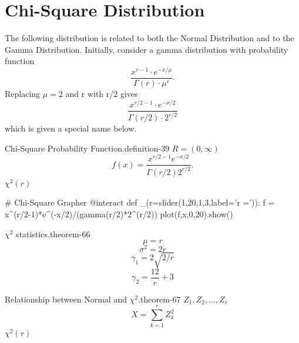 \documentclass[10pt,]{book}
\numberwithin{equation}{section}
\begin{document}
\section[{Chi-Square Distribution}]{Chi-Square Distribution}\label{section-59}
\hypertarget{p-1200}{}%
The following distribution is related to both the Normal Distribution and to the Gamma Distribution. Initially, consider a gamma distribution with probability function%
\begin{equation*}
\frac{x^{r-1} \cdot e^{-x / \mu}}{\Gamma(r) \cdot \mu^r}.
\end{equation*}
Replacing \(\mu = 2\) and r with r/2 gives%
\begin{equation*}
\frac{x^{r/2-1} \cdot e^{-x/2}}{\Gamma(r/2) \cdot 2^{r/2}}
\end{equation*}
which is given a special name below.%
\par
\hypertarget{p-1201}{}%
\begin{definition}{Chi-Square Probability Function.}{definition-39}%
\(R = (0,\infty)\)%
\begin{equation*}
f(x) = \frac{x^{r/2-1} e^{-x/2} }{\Gamma(r/2) 2^{r/2}}.
\end{equation*}
\(\chi^2(r)\)\end{definition}
%
\par
\hypertarget{p-1202}{}%
\leavevmode%
\begin{sageinput}
# Chi-Square Grapher
@interact
def _(r=slider(1,20,1,3,label='r =')):
    f = x^(r/2-1)*e^(-x/2)/(gamma(r/2)*2^(r/2))
    plot(f,x,0,20).show()
\end{sageinput}
%
\par
\hypertarget{p-1203}{}%
\begin{theorem}{\(\chi^2\) statistics.}{}{theorem-66}%
%
\begin{equation*}
\mu = r
\end{equation*}
%
\begin{equation*}
\sigma^2 = 2r
\end{equation*}
%
\begin{equation*}
\gamma_1 = 2 \sqrt{2/r}
\end{equation*}
%
\begin{equation*}
\gamma_2 = \frac{12}{r} + 3
\end{equation*}
\end{theorem}
%
\par
\hypertarget{p-1204}{}%
\begin{theorem}{Relationship between Normal and \(\chi^2\).}{}{theorem-67}%
\(Z_1, Z_2, ..., Z_r\)%
\begin{equation*}
X = \sum_{k=1}^r Z_k^2
\end{equation*}
\(\chi^2(r)\)\end{theorem}
\end{document}
